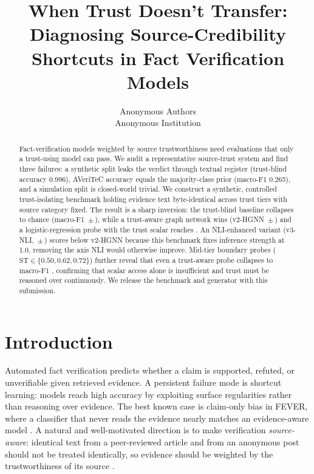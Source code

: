 \documentclass[11pt]{article}
\title{When Trust Doesn't Transfer: Diagnosing Source-Credibility Shortcuts in Fact Verification Models}
\author{Anonymous Authors \\
  Anonymous Institution}
\begin{document}
\maketitle

\begin{abstract}
Fact-verification models weighted by source trustworthiness need evaluations that only a trust-using model can pass. We audit a representative source-trust system and find three failures: a synthetic split leaks the verdict through textual register (trust-blind accuracy 0.996), AVeriTeC accuracy equals the majority-class prior (macro-F1 0.265), and a simulation split is closed-world trivial. We construct a synthetic, controlled trust-isolating benchmark holding evidence text byte-identical across trust tiers with source category fixed. The result is a sharp inversion: the trust-blind baseline collapses to chance (macro-F1 \BaselineMF\,$\pm$\,\BaselineStd), while a trust-aware graph network wins (v2-HGNN \VtwoMF\,$\pm$\,\VtwoStd) and a logistic-regression probe with the trust scalar reaches \LogAwareMF. An NLI-enhanced variant (v3-NLI, \VthreeMF\,$\pm$\,\VthreeStd) scores below v2-HGNN because this benchmark fixes inference strength at 1.0, removing the axis NLI would otherwise improve. Mid-tier boundary probes ($\mathrm{ST}\in\{0.50,0.62,0.72\}$) further reveal that even a trust-aware probe collapses to macro-F1 \MidTierMF, confirming that scalar access alone is insufficient and trust must be reasoned over continuously. We release the benchmark and generator with this submission.
\end{abstract}

\section{Introduction}
Automated fact verification predicts whether a claim is supported, refuted, or unverifiable given retrieved evidence. A persistent failure mode is shortcut learning: models reach high accuracy by exploiting surface regularities rather than reasoning over evidence. The best known case is claim-only bias in FEVER, where a classifier that never reads the evidence nearly matches an evidence-aware model \citep{schuster2019debias}. A natural and well-motivated direction is to make verification \emph{source-aware}: identical text from a peer-reviewed article and from an anonymous post should not be treated identically, so evidence should be weighted by the trustworthiness of its source \citep{popat2018declare,baly2018factuality}.
\end{document}
